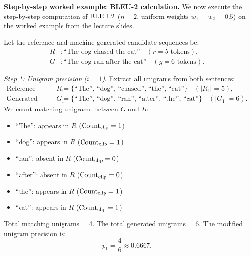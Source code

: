 \documentclass[../../main.tex]{subfiles}
\begin{document}
\noindent\textbf{Step-by-step worked example: BLEU-2 calculation.}\newline
We now execute the step-by-step computation of $\mathrm{BLEU}\text{-}2$ ($n=2$, uniform weights $w_1 = w_2 = 0.5$) on the worked example from the lecture slides.

Let the reference and machine-generated candidate sequences be:
\begin{align*}
R &: \text{``The dog chased the cat''} \quad (r = 5 \text{ tokens}), \\
G &: \text{``The dog ran after the cat''} \quad (g = 6 \text{ tokens}).
\end{align*}

\textit{Step 1: Unigram precision ($i = 1$).}
Extract all unigrams from both sentences:
\begin{align*}
\text{Reference unigrams } R_1 &= \{\text{``The''}, \, \text{``dog''}, \, \text{``chased''}, \, \text{``the''}, \, \text{``cat''}\} \quad (|R_1| = 5), \\
\text{Generated unigrams } G_1 &= \{\text{``The''}, \, \text{``dog''}, \, \text{``ran''}, \, \text{``after''}, \, \text{``the''}, \, \text{``cat''}\} \quad (|G_1| = 6).
\end{align*}
We count matching unigrams between $G$ and $R$:
\begin{itemize}
    \item ``The'': appears in $R$ ($\operatorname{Count}_{\text{clip}} = 1$)
    \item ``dog'': appears in $R$ ($\operatorname{Count}_{\text{clip}} = 1$)
    \item ``ran'': absent in $R$ ($\operatorname{Count}_{\text{clip}} = 0$)
    \item ``after'': absent in $R$ ($\operatorname{Count}_{\text{clip}} = 0$)
    \item ``the'': appears in $R$ ($\operatorname{Count}_{\text{clip}} = 1$)
    \item ``cat'': appears in $R$ ($\operatorname{Count}_{\text{clip}} = 1$)
\end{itemize}
Total matching unigrams = 4. The total generated unigrams = 6. The modified unigram precision is:
\begin{equation}
p_1 = \frac{4}{6} \approx \mathbf{0.6667}.
\end{equation}
\end{document}
